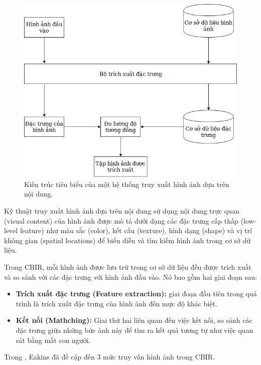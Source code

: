\documentclass[a4paper,14pt]{extreport}
\begin{document}
\begin{figure}[h] 
    \centering
    \includegraphics[scale=0.5]{img/cbri-architect.jpg}
    \caption{Kiến trúc tiêu biểu của một hệ thống truy xuất hình ảnh dựa trên nội dung.}
    \label{fig:cbri}
\end{figure}
\par
Kỹ thuật truy xuất hình ảnh dựa trên nội dung sử dụng nội dung trực quan (visual content) của hình ảnh được mô tả dưới dạng các đặc trưng cấp thấp (low-level feature) như màu sắc (color), kết cấu (texture), hình dạng (shape) và vị trí không gian (spatial locations) để biểu diễn  và tìm kiếm hình ảnh trong cơ sở dữ liệu.\cite{cbir-defi}
\par 
Trong CBIR, mỗi hình ảnh được lưu trữ trong cơ sở dữ liệu đều được trích xuất và so sánh với các đặc trưng với hình ảnh đầu vào. 
Nó bao gồm hai giai đoạn sau: \cite{features} 
\begin{itemize}
    \item \textbf{Trích xuất đặc trưng (Feature extraction):} giai đoạn đầu tiên trong quá trình  là trích xuất đặc trưng của hình ảnh đến mực độ khác biệt.
    \item  \textbf{Kết nối (Mathching):} Giai thứ hai liên quan đến việc kết nối, so sánh các đặc trưng giữa những bức ảnh này để tìm ra kết quả tương tự như việc quan sát bằng mắt con người.
\end{itemize}
\par
 Trong \cite{level-cbir}, Eakins đã đề cập đến 3 mức truy vấn hỉnh ảnh trong CBIR.
 \par
\end{document}
